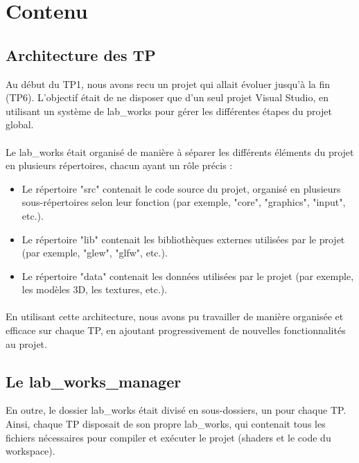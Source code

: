 \documentclass[10pt,a4paper]{article}
\begin{document}
\section{Contenu}
	\subsection{Architecture des TP}
		Au début du TP1, nous avons recu un projet qui allait évoluer jusqu'à la fin (TP6). L'objectif était de ne disposer que d'un seul projet Visual Studio, en utilisant un système de lab\_works pour gérer les différentes étapes du projet global.

		\paragraph{}Le lab\_works était organisé de manière à séparer les différents éléments du projet en plusieurs répertoires, chacun ayant un rôle précis :

		\begin{itemize}
			\item Le répertoire "src" contenait le code source du projet, organisé en plusieurs sous-répertoires selon leur fonction (par exemple, "core", "graphics", "input", etc.).
			\item Le répertoire "lib" contenait les bibliothèques externes utilisées par le projet (par exemple, "glew", "glfw", etc.).
			\item Le répertoire "data" contenait les données utilisées par le projet (par exemple, les modèles 3D, les textures, etc.).
		\end{itemize}

		\paragraph{}En utilisant cette architecture, nous avons pu travailler de manière organisée et efficace sur chaque TP, en ajoutant progressivement de nouvelles fonctionnalités au projet.

	\subsection{Le lab\_works\_manager} %
		En outre, le dossier lab\_works était divisé en sous-dossiers, un pour chaque TP. Ainsi, chaque TP disposait de son propre lab\_works, qui contenait tous les fichiers nécessaires pour compiler et exécuter le projet (shaders et le code du workspace).
\end{document}
